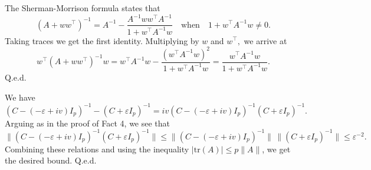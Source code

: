 \documentclass[12pt, a4paper]{article}
\newcommand\tr{{\mathrm{tr}}}
\begin{document}
  The Sherman-Morrison formula states that 
 \[(A+ww^\top )^{-1}= A^{-1}-\frac{ A^{-1}ww^\top A^{-1}}{1+ w^\top A^{-1}w}\quad\text{when}\quad 1+ w^\top A^{-1}w\neq 0.\]
 Taking traces we get the first identity. Multiplying by $w$ and $w^\top,$ we arrive at 
\[w^\top(A+ww^\top )^{-1}w= w^\top A^{-1}w-\frac{(w^\top A^{-1}w)^2}{1+ w^\top A^{-1}w}=\frac{ w^\top A^{-1}w}{1+ w^\top A^{-1}w}.\]
Q.e.d.

 We have 
\[ (C-(-\varepsilon+iv)I_p)^{-1}-(C+\varepsilon I_p)^{-1}=iv(C-(-\varepsilon+iv)I_p)^{-1}(C+\varepsilon I_p)^{-1}.\]
 Arguing as in the proof of Fact 4, we see that 
\[\|(C-(-\varepsilon+iv)I_p)^{-1}(C+\varepsilon I_p)^{-1}\|\leqslant 
\|(C-(-\varepsilon+iv)I_p)^{-1}\|\,\|(C+\varepsilon I_p)^{-1}\|\leqslant \varepsilon^{-2}.\]
Combining these relations and using the inequality $|\tr(A)|\leqslant p\|A\|$, we get the desired bound. Q.e.d.
\end{document}
